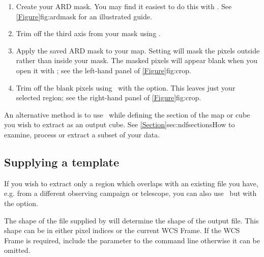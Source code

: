 \documentclass[11pt,oneside,chapters]{starlink}
\begin{document}
\begin{enumerate}[label=(\arabic*)]
\item Create your ARD mask. You may find it easiest to do this with
\gaia. See \cref{Figure}{fig:ardmask}{} for an illustrated guide.

\item Trim off the third axis from your mask using \ndfcopy.
\begin{terminalv}
\end{terminalv}

\item Apply the saved ARD mask to your map. Setting
 will mask the pixels outside rather than inside
your mask. The masked pixels will appear blank when you open it with
\gaia; see the left-hand panel of \cref{Figure}{fig:crop}{}.
\begin{terminalv}
\end{terminalv}

\item Trim off the blank pixels using \ndfcopy\ with the
 option. This leaves just your selected region; see the
right-hand panel of \cref{Figure}{fig:crop}{}.
\begin{terminalv}
\end{terminalv}
\end{enumerate}

An alternative method is to use \ndfcopy\ while defining the section
of the map or cube you wish to extract as an output cube. See
\cref{Section}{sec:ndfsections}{How to examine, process or extract a
subset of your data}.

\subsection{Supplying a template}

If you wish to extract only a region which overlaps with an existing
file you have, e.g. from a different observing campaign or telescope,
you can also use \ndfcopy\ but with the  option.
\begin{terminalv}
\end{terminalv}
The shape of the file supplied by  will determine the
shape of the output file. This shape can be in either pixel indices or
the current WCS Frame. If the WCS Frame is required, include the
parameter  to the command line otherwise it can be
omitted.
\end{document}
